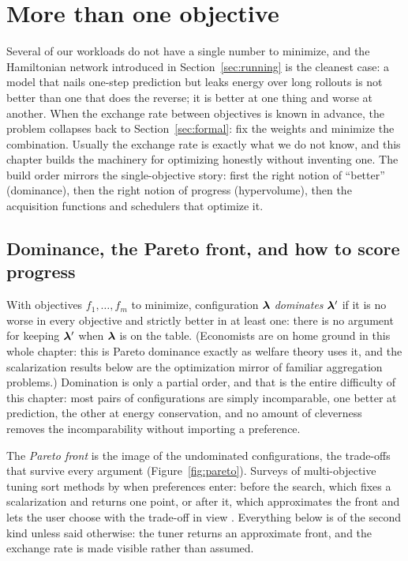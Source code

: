 \chapter{More than one objective}
\label{sec:moo}

Several of our workloads do not have a single number to minimize, and the
Hamiltonian network introduced in Section~\ref{sec:running} is the cleanest
case: a model that nails one-step prediction but leaks energy over long
rollouts is not better than one that does the reverse; it is better at one
thing and worse at another. When the exchange rate between objectives is
known in advance, the problem collapses back to
Section~\ref{sec:formal}: fix the weights and minimize the combination.
Usually the exchange rate is exactly what we do not know, and this chapter
builds the machinery for optimizing honestly without inventing one. The
build order mirrors the single-objective story: first the right notion of
``better'' (dominance), then the right notion of progress (hypervolume),
then the acquisition functions and schedulers that optimize it.

\section{Dominance, the Pareto front, and how to score progress}

With objectives $f_1, \dots, f_m$ to minimize, configuration $\bm{\lambda}$
\emph{dominates} $\bm{\lambda}'$ if it is no worse in every objective and
strictly better in at least one: there is no argument for keeping
$\bm{\lambda}'$ when $\bm{\lambda}$ is on the table. (Economists are on home
ground in this whole chapter: this is Pareto dominance exactly as
welfare theory uses it, and the scalarization results below are the
optimization mirror of familiar aggregation problems.) Domination is only a partial
order, and that is the entire difficulty of this chapter: most pairs of
configurations are simply incomparable, one better at prediction, the
other at energy conservation, and no amount of cleverness removes the
incomparability without importing a preference.

The \emph{Pareto front} is
the image of the undominated configurations, the trade-offs that survive
every argument (Figure~\ref{fig:pareto}). Surveys of multi-objective
tuning sort methods by when preferences enter: before the search, which
fixes a scalarization and returns one point, or after it, which
approximates the front and lets the user choose with the trade-off in view
\citep{karl2023moo, morales2022survey}. Everything below is of the second
kind unless said otherwise: the tuner returns an approximate front, and
the exchange rate is made visible rather than assumed.

